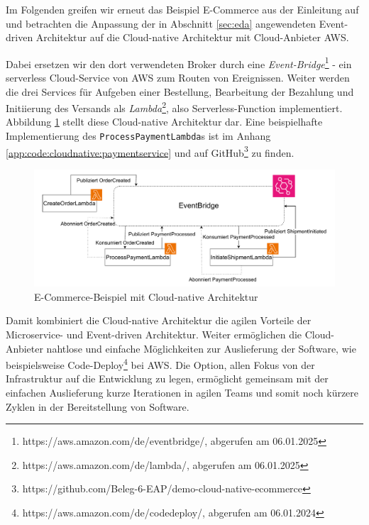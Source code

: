 \documentclass[acmtog]{acmart}
\begin{document}
Im Folgenden greifen wir erneut das Beispiel E-Commerce aus der Einleitung auf und betrachten die Anpassung der in
Abschnitt \ref{sec:eda} angewendeten Event-driven Architektur auf die Cloud-native Architektur mit Cloud-Anbieter AWS\@.

Dabei ersetzen wir den dort verwendeten Broker durch eine \textit{Event-Bridge}\footnote{https://aws.amazon.com/de/eventbridge/, abgerufen am 06.01.2025}
- ein serverless Cloud-Service von AWS zum Routen von Ereignissen.
Weiter werden die drei Services für Aufgeben einer Bestellung, Bearbeitung der Bezahlung und Initiierung des Versands als \textit{Lambda}\footnote{https://aws.amazon.com/de/lambda/, abgerufen am 06.01.2025},
also Serverless-Function implementiert.
Abbildung \ref{fig:cloudnativeecommerce} stellt diese Cloud-native Architektur dar.
Eine beispielhafte Implementierung des \texttt{ProcessPaymentLambda}s ist im Anhang \ref{app:code:cloudnative:paymentservice} und auf GitHub\footnote{https://github.com/Beleg-6-EAP/demo-cloud-native-ecommerce} zu finden.
\begin{figure}[!h]
  \centering
  \includegraphics[width=\linewidth]{images/cloud-native/cloud-native-ecommerce.drawio}
  \caption{E-Commerce-Beispiel mit Cloud-native Architektur}
  \label{fig:cloudnativeecommerce}
\end{figure}

Damit kombiniert die Cloud-native Architektur die agilen Vorteile der Microservice- und Event-driven Architektur.
Weiter ermöglichen die Cloud-Anbieter nahtlose und einfache Möglichkeiten zur Auslieferung der Software,
wie beispielsweise Code-Deploy\footnote{https://aws.amazon.com/de/codedeploy/, abgerufen am 06.01.2024} bei AWS\@.
Die Option, allen Fokus von der Infrastruktur auf die Entwicklung zu legen, ermöglicht gemeinsam mit der einfachen Auslieferung kurze Iterationen in agilen Teams
und somit noch kürzere Zyklen in der Bereitstellung von Software.
\end{document}
